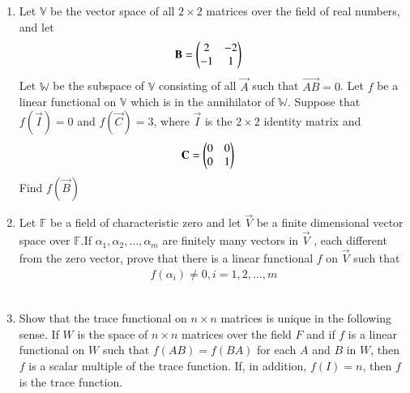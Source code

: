 \renewcommand{\theequation}{\theenumi}
\renewcommand{\thefigure}{\theenumi}
\begin{enumerate}[label=\thesubsection.\arabic*.,ref=\thesubsection.\theenumi]

\item Let $\mathbb{V}$ be the vector space of all $2 \times 2$ matrices over the field of real numbers, and let
\begin{align}
\mathbf{B} &= \begin{pmatrix}2&-2\\-1&1\end{pmatrix}
\end{align}
Let $\mathbb{W}$ be the subspace of $\mathbb{V}$ consisting of all $\vec{A}$ such that $\vec{AB} = 0$. Let $f$ be a linear functional on $\mathbb{V}$ which is in the annihilator of $\mathbb{W}$. Suppose that $f(\vec{I}) = 0$ and $f(\vec{C}) = 3$, where $\vec{I}$ is the $2 \times 2$ identity matrix and
\begin{align}
\mathbf{C} &= \begin{pmatrix}0&0\\0&1\end{pmatrix}
\end{align}
Find $f(\vec{B})$
%
\\
\solution
%
\item Let $\mathbb{F}$ be a field of characteristic zero and let $\vec{V}$ be a finite dimensional vector space over  $\mathbb{F}$.If $\alpha_1,\alpha_2,\hdots,\alpha_m$ are finitely many vectors in $\vec{V}$ , each different from the zero vector, prove that there is a linear functional $f$ on $\vec{V}$ such that
\begin{align}
    f(\alpha_i) \neq 0, i=1,2,\hdots,m
\end{align}
%
\\
\solution
%
\item Show that the trace functional on $n\times n$ matrices is unique in the following sense. If $W$ is the space of $n \times n$ matrices over the field $F$ and if $f$ is a linear functional on $W$ such that $f(AB) = f(BA)$ for each $A$ and $B$ in $W$, then $f$ is a scalar multiple of the trace function. If, in addition, $f(I)=n$, then $f$ is the trace function.
\\
\solution

\end{enumerate}

